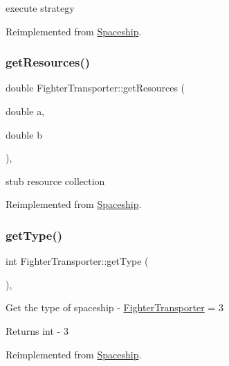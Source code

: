 execute strategy 

Reimplemented from \hyperlink{classSpaceship}{Spaceship}.

\mbox{\label{classFighterTransporter_ab2b29c07f0e5fd4fa5e35a37abefb26d}} 
\subsubsection{\texorpdfstring{get\+Resources()}{getResources()}}
{\footnotesize\ttfamily double Fighter\+Transporter\+::get\+Resources (\begin{DoxyParamCaption}\item[{double}]{a,  }\item[{double}]{b }\end{DoxyParamCaption})\hspace{0.3cm}{\ttfamily [inline]}, {\ttfamily [virtual]}}

stub resource collection 

Reimplemented from \hyperlink{classSpaceship_ad2027533de1d789db5e3efa22055f2d0}{Spaceship}.

\mbox{\label{classFighterTransporter_ad173e903951580bb222eb94896a15407}} 
\subsubsection{\texorpdfstring{get\+Type()}{getType()}}
{\footnotesize\ttfamily int Fighter\+Transporter\+::get\+Type (\begin{DoxyParamCaption}{ }\end{DoxyParamCaption})\hspace{0.3cm}{\ttfamily [inline]}, {\ttfamily [virtual]}}

Get the type of spaceship -\/ \hyperlink{classFighterTransporter}{Fighter\+Transporter} = 3 \begin{DoxyReturn}{Returns}
int -\/ 3 
\end{DoxyReturn}


Reimplemented from \hyperlink{classSpaceship_a113055e6d793f8fbc55e44efc4d57e07}{Spaceship}.

